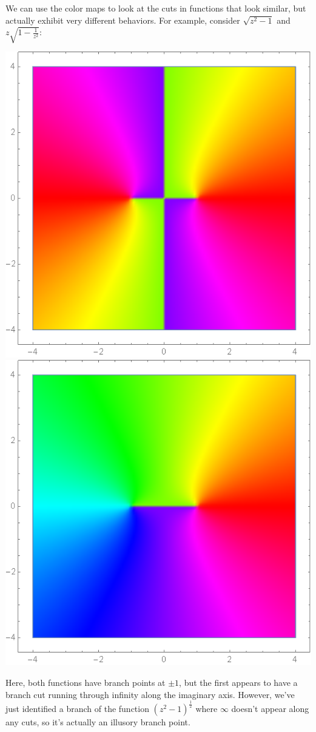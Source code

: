 We can use the color maps to look at the cuts in functions that look similar, but actually exhibit very different behaviors. For example, consider $\sqrt{z^2-1}$ and $z \sqrt{1-\frac{1}{z^2}}$:
\begin{center}
    \includegraphics[scale=0.27]{images/sqrtzsqrminus1.png}
    \includegraphics[scale=0.27]{images/sqrtzsqrminus2.png}
\end{center}
Here, both functions have branch points at $\pm 1$, but the first appears to have a branch cut running through infinity along the imaginary axis. However, we've just identified a branch of the function $(z^2-1)^{\frac{1}{2}}$ where $\infty$ doesn't appear along any cuts, so it's actually an illusory branch point.

